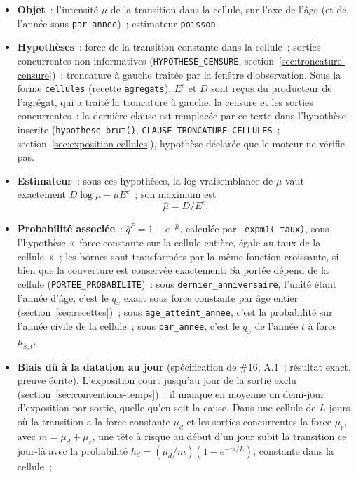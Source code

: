 \documentclass[a4paper,11pt]{article}
\newcommand{\code}[1]{\texttt{\small #1}}
\begin{document}
\begin{itemize}[leftmargin=*, itemsep=2pt]
  \item \textbf{Objet}~: l'intensité $\mu$ de la transition dans la cellule,
    sur l'axe de l'âge (et de l'année sous \code{par\_annee})~; estimateur
    \code{poisson}.
  \item \textbf{Hypothèses}~: force de la transition constante dans la
    cellule~; sorties concurrentes non informatives
    (\code{HYPOTHESE\_CENSURE}, section~\ref{sec:troncature-censure})~;
    troncature à gauche traitée par la fenêtre d'observation. Sous la forme
    \code{cellules} (recette \code{agregats}), $E^c$ et $D$ sont reçus du
    producteur de l'agrégat, qui a traité la troncature à gauche, la censure
    et les sorties concurrentes~: la dernière clause est remplacée par ce
    texte dans l'hypothèse inscrite (\code{hypothese\_brut()},
    \code{CLAUSE\_TRONCATURE\_CELLULES}~; section~\ref{sec:exposition-cellules}),
    hypothèse déclarée que le moteur ne vérifie pas.
  \item \textbf{Estimateur}~: sous ces hypothèses, la log-vraisemblance de
    $\mu$ vaut exactement $D \log \mu - \mu E^c$~; son maximum est
    \[
      \hat\mu = D / E^c .
    \]
  \item \textbf{Probabilité associée}~: $\hat q^{P} = 1 - e^{-\hat\mu}$,
    calculée par \code{-expm1(-taux)}, sous l'hypothèse «~force constante sur
    la cellule entière, égale au taux de la cellule~»~; les bornes sont
    transformées par la même fonction croissante, si bien que la couverture
    est conservée exactement. Sa portée dépend de la cellule
    (\code{PORTEE\_PROBABILITE})~: sous \code{dernier\_anniversaire}, l'unité
    étant l'année d'âge, c'est le $q_x$ exact sous force constante par âge
    entier (section~\ref{sec:recettes})~; sous \code{age\_atteint\_annee},
    c'est la probabilité sur l'année civile de la cellule~; sous
    \code{par\_annee}, c'est le $q_x$ de l'année $t$ à force $\mu_{x,t}$.
  \item \textbf{Biais dû à la datation au jour} (spécification de \#16, A.1~;
    résultat exact, preuve écrite). L'exposition court jusqu'au jour de la
    sortie exclu (section~\ref{sec:conventions-temps})~: il manque en moyenne
    un demi-jour d'exposition par sortie, quelle qu'en soit la cause. Dans une
    cellule de $L$ jours où la transition a la force constante $\mu_d$ et les
    sorties concurrentes la force $\mu_r$, avec $m = \mu_d + \mu_r$, une tête
    à risque au début d'un jour subit la transition ce jour-là avec la
    probabilité $h_d = (\mu_d/m)(1 - e^{-m/L})$, constante dans la cellule~;

\end{itemize}
\end{document}
